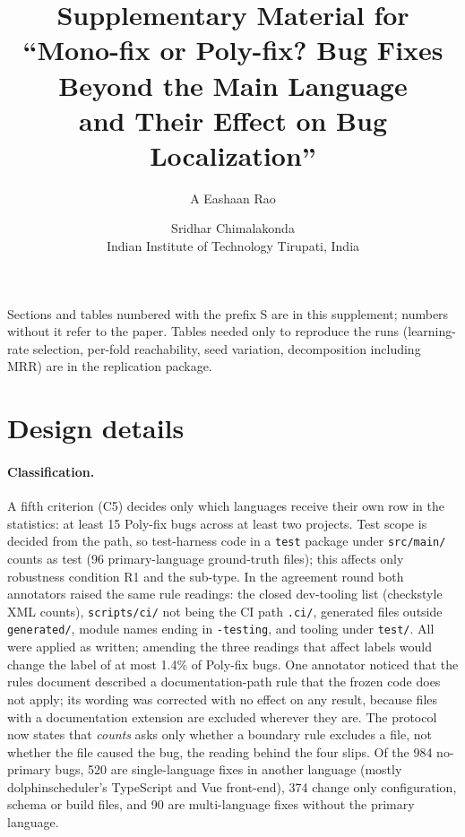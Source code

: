 \documentclass[10pt,a4paper]{article}
\title{Supplementary Material for\\``Mono-fix or Poly-fix? Bug Fixes Beyond the Main Language\\and Their Effect on Bug Localization''}
\author{A Eashaan Rao \and Sridhar Chimalakonda\\[2pt]\small Indian Institute of Technology Tirupati, India}
\date{}
\begin{document}
\maketitle
\noindent Sections and tables numbered with the prefix S are in this
supplement; numbers without it refer to the paper. Tables needed only to
reproduce the runs (learning-rate selection, per-fold reachability, seed
variation, decomposition including MRR) are in the replication package.

\section{Design details}\label{app:design}

\paragraph{Classification.} A fifth criterion (C5) decides only which
languages receive their own row in the statistics: at least 15 Poly-fix bugs
across at least two projects. Test scope is decided from the path, so
test-harness code in a \texttt{test} package under \texttt{src/main/} counts as
test (96 primary-language ground-truth files); this affects only robustness condition
R1 and the sub-type. In the agreement round both annotators raised the same rule readings:
the closed dev-tooling list (checkstyle XML counts), \texttt{scripts/ci/} not
being the CI path \texttt{.ci/}, generated files outside \texttt{generated/},
module names ending in \texttt{-testing}, and tooling under \texttt{test/}. All
were applied as written; amending the three readings that affect labels would
change the label of at most 1.4\% of Poly-fix bugs. One annotator
noticed that the rules document described a documentation-path rule that the
frozen code does not apply; its wording was corrected with no effect on any
result, because files with a documentation extension are excluded wherever
they are. The protocol now states that \emph{counts} asks only whether a
boundary rule excludes a file, not whether the file caused the bug, the
reading behind the four slips. Of the 984 no-primary bugs, 520 are
single-language fixes in another language (mostly dolphinscheduler's
TypeScript and Vue front-end), 374 change only configuration, schema or build
files, and 90 are multi-language fixes without the primary language.
\end{document}
